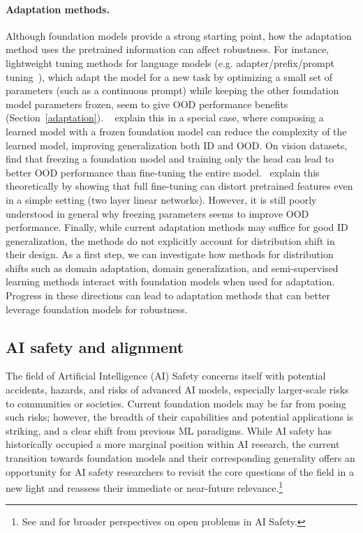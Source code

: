 \paragraph{Adaptation methods.} Although foundation models provide a strong starting point, how the adaptation method uses the pretrained information can affect robustness. For instance, lightweight tuning methods for language models (e.g. adapter/prefix/prompt tuning~\citep{houlsby19adapter,li2021prefix,lester2021power}), which adapt the model for a new task by optimizing a small set of parameters (such as a continuous prompt) while keeping the other foundation model parameters frozen, seem to give OOD performance benefits (Section~\ref{adaptation}).
~\citet{xie2021composed} explain this in a special case, where composing a learned model with a frozen foundation model can reduce the complexity of the learned model, improving generalization both ID and OOD. On vision datasets,~\citet{wortsman2021robust, kumar2022finetuning} find that freezing a foundation model and training only the head can lead to better OOD performance than fine-tuning the entire model.~\citet{kumar2022finetuning} explain this theoretically by showing that full fine-tuning can distort pretrained features even in a simple setting (two layer linear networks). However, it is still poorly understood in general why freezing parameters seems to improve OOD performance. Finally, while current adaptation methods may suffice for good ID generalization, the methods do not explicitly account for distribution shift in their design. As a first step, we can investigate how methods for distribution shifts such as domain adaptation, domain generalization, and semi-supervised learning methods interact with foundation models when used for adaptation. Progress in these directions can lead to adaptation methods that can better leverage foundation models for robustness.

\newsection
\subsection{AI safety and alignment}
\label{sec:ai-safety}

The field of Artificial Intelligence (AI) Safety concerns itself with potential accidents, hazards, and risks of advanced AI models, especially larger-scale risks to communities or societies. Current foundation models may be far from posing such risks; however, the breadth of their capabilities and potential applications is striking, and a clear shift from previous ML paradigms. While AI safety has historically occupied a more marginal position within AI research, the current transition towards foundation models and their corresponding generality offers an opportunity for AI safety researchers to revisit the core questions of the field in a new light and reassess their immediate or near-future relevance.\footnote{See \citet{amodei2016concrete} and \citet{hendryckssafety2021} for broader perspectives on open problems in AI Safety.}

